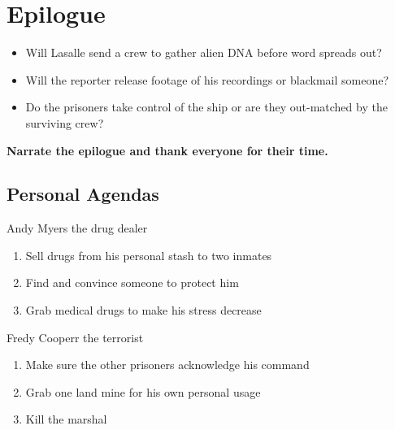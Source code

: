 \chapter{Epilogue}


\begin{rpg-commentbox}{}


\begin{itemize}
    \item Will Lasalle send a crew to gather alien DNA before word spreads out?
    \item Will the reporter release footage of his recordings or blackmail someone?
    \item Do the prisoners take control of the ship or are they out-matched by the surviving crew?
\end{itemize}    

    \medskip

    \textbf{Narrate the epilogue and thank everyone for their time.}
 \end{rpg-commentbox}

 \newsect

 \section{Personal Agendas}


 
\begin{rpg-commentbox}{Andy Myers the drug dealer}
    \begin{enumerate}[label=\textbf{Act \arabic*}, leftmargin=1cm]
        \item Sell drugs from his personal stash to two inmates
        \item Find and convince someone to protect him
        \item Grab medical drugs to make his stress decrease
    \end{enumerate}
\end{rpg-commentbox}

\begin{rpg-commentbox}{Fredy Cooperr the terrorist}
    \begin{enumerate}[label=\textbf{Act \arabic*}, leftmargin=1cm]
        \item Make sure the other prisoners acknowledge his command
        \item Grab one land mine for his own personal usage
        \item Kill the marshal
    \end{enumerate}
\end{rpg-commentbox}


